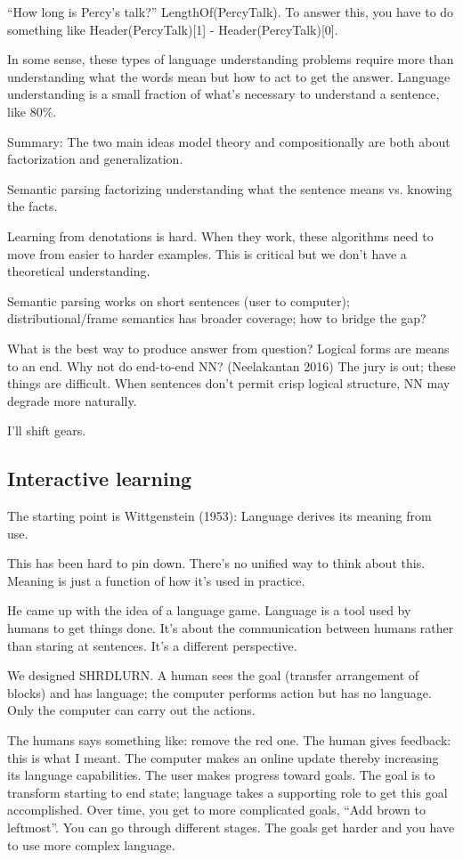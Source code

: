 ``How long is Percy's talk?'' LengthOf(PercyTalk). To answer this, you have to do something like Header(PercyTalk)[1] - Header(PercyTalk)[0]. 

In some sense, these types of language understanding problems require more than understanding what the words mean but how to act to get the answer. Language understanding is a small fraction of what's necessary to understand a sentence, like $80\%$.

Summary: The two main ideas model theory and compositionally are both about factorization and generalization.

Semantic parsing factorizing understanding what the sentence means vs. knowing the facts.

Learning from denotations is hard. When they work, these algorithms need to move from easier to harder examples. This is critical but we don't have a theoretical understanding.

Semantic parsing works on short sentences (user to computer); distributional/frame semantics has broader coverage; how to bridge the gap? 

What is the best way to produce answer from question? Logical forms are means to an end. Why not do end-to-end NN? (Neelakantan 2016) The jury is out; these things are difficult. %
When sentences don't permit crisp logical structure, NN may degrade more naturally.


I'll shift gears.

\subsection{Interactive learning}

The starting point is Wittgenstein (1953): Language derives its meaning from use. 

This has been hard to pin down. There's no unified way to think about this. Meaning is just a function of how it's used in practice.

He came up with the idea of a language game. Language is a tool used by humans to get things done. It's about the communication between humans rather than staring at sentences. It's a different perspective.

We designed SHRDLURN. A human sees the goal (transfer arrangement of blocks) and has language; the computer performs action but has no language. Only the computer can carry out the actions.

The humans says something like: remove the red one.  The human gives feedback: this is what I meant. The computer makes an online update thereby increasing its language capabilities. The user makes progress toward goals. The goal is to transform starting to end state; language takes a supporting role to get this goal accomplished.
Over time, you get to more complicated goals, ``Add brown to leftmost''. You can go through different stages. The goals get harder and you have to use more complex language.

